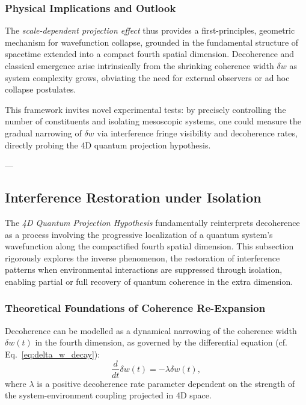 \documentclass[12pt]{article}
\begin{document}
\subsubsection*{Physical Implications and Outlook}

The \emph{scale-dependent projection effect} thus provides a first-principles, geometric mechanism for wavefunction collapse, grounded in the fundamental structure of spacetime extended into a compact fourth spatial dimension. Decoherence and classical emergence arise intrinsically from the shrinking coherence width \(\delta w\) as system complexity grows, obviating the need for external observers or ad hoc collapse postulates.

This framework invites novel experimental tests: by precisely controlling the number of constituents and isolating mesoscopic systems, one could measure the gradual narrowing of \(\delta w\) via interference fringe visibility and decoherence rates, directly probing the 4D quantum projection hypothesis.

---


\subsection{Interference Restoration under Isolation}

The \emph{4D Quantum Projection Hypothesis} fundamentally reinterprets decoherence as a process involving the progressive localization of a quantum system's wavefunction along the compactified fourth spatial dimension. This subsection rigorously explores the inverse phenomenon, the restoration of interference patterns when environmental interactions are suppressed through isolation, enabling partial or full recovery of quantum coherence in the extra dimension.

\subsubsection*{Theoretical Foundations of Coherence Re-Expansion}

Decoherence can be modelled as a dynamical narrowing of the coherence width \(\delta w(t)\) in the fourth dimension, as governed by the differential equation (cf. Eq.~\eqref{eq:delta_w_decay}):
\begin{equation}
\frac{d}{dt} \delta w(t) = -\lambda \delta w(t),
\label{eq:decoherence_decay}
\end{equation}
where \(\lambda\) is a positive decoherence rate parameter dependent on the strength of the system-environment coupling projected in 4D space.
\end{document}
